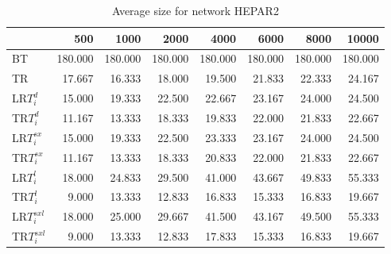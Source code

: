 \begin{table}
\begin{center}
\begin{tabular}{lrrrrrrr}
 & 500 & 1000 & 2000 & 4000 & 6000 & 8000 & 10000\\\hline
BT & 180.000 & 180.000 & 180.000 & 180.000 & 180.000 & 180.000 & 180.000\\\hline
TR & 17.667 & 16.333 & 18.000 & 19.500 & 21.833 & 22.333 & 24.167\\\hline
LR$T_i^d$ & 15.000 & 19.333 & 22.500 & 22.667 & 23.167 & 24.000 & 24.500\\\hline
TR$T_i^d$ & 11.167 & 13.333 & 18.333 & 19.833 & 22.000 & 21.833 & 22.667\\\hline
LR$T_i^{sx}$ & 15.000 & 19.333 & 22.500 & 23.333 & 23.167 & 24.000 & 24.500\\\hline
TR$T_i^{sx}$ & 11.167 & 13.333 & 18.333 & 20.833 & 22.000 & 21.833 & 22.667\\\hline
LR$T_i^l$ & 18.000 & 24.833 & 29.500 & 41.000 & 43.667 & 49.833 & 55.333\\\hline
TR$T_i^l$ & 9.000 & 13.333 & 12.833 & 16.833 & 15.333 & 16.833 & 19.667\\\hline
LR$T_i^{sxl}$ & 18.000 & 25.000 & 29.667 & 41.500 & 43.167 & 49.500 & 55.333\\\hline
TR$T_i^{sxl}$ & 9.000 & 13.333 & 12.833 & 17.833 & 15.333 & 16.833 & 19.667\\\hline
\end{tabular}
\end{center}
\caption{Average size for network HEPAR2 }
\label{Hepar2si}
\end{table}

